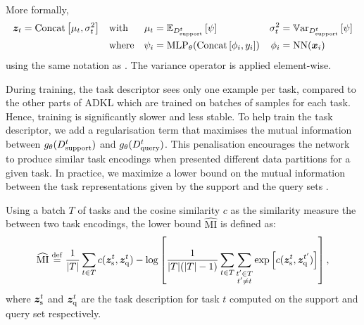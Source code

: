 \documentclass[11pt]{article}
\numberwithin{equation}{subsection}
\begin{document}
More formally,
\begin{align}
  {\bm{z}}_t &= \mathrm{Concat} \left[ \mu_t, \sigma_t^2 \right] & &\text{with} & \mu_t &= \mathbb{E}_{D_{\mathrm{support}}^t} \left[ \psi \right] & \sigma_t^2 &= \mathbb{V}\textrm{ar}_{D_{\mathrm{support}}^t} \left[ \psi \right] \\
  & & & \text{where} & \psi_i &= \mathrm{MLP}_\theta(\mathrm{Concat}\left[ \phi_i, y_i \right]) & \phi_i &= \mathrm{NN}({\bm{x}}_i)
\end{align}
using the same notation as . The variance operator is applied element-wise.

During training, the task descriptor sees only one example per task, compared to the other parts of ADKL which are trained on batches of samples for each task. Hence, training is significantly slower and less stable.
To help train the task descriptor, we add a regularisation term that maximises the mutual information between $g_\theta({D_{\mathrm{support}}^t})$ and $g_\theta({D_{\mathrm{query}}^t})$.
This penalisation encourages the network to produce similar task encodings when presented different data partitions for a given task.
In practice, we maximize a lower bound on the mutual information between the task representations given by the support and the query sets \citep{belghazi2018mine}.

Using a batch $T$ of tasks and the cosine similarity $c$ as the similarity measure the between two task encodings, the lower bound $\widehat{\mathrm{MI}}$ is defined as:
\begin{equation}
  \widehat{\mathrm{MI}} \stackrel{\mathrm{def}}{=} \frac{1}{|T|} \sum_{t \in T} c({\bm{z}}_\mathrm{s}^t, {\bm{z}}_\mathrm{q}^t)
  - \log \left[ \frac{1}{|T|(|T| - 1)} \sum_{t \in T} \sum_{\substack{t' \in T\\t' \neq t}} \exp \left[ c({\bm{z}}_\mathrm{s}^t, {\bm{z}}_\mathrm{q}^{t'}) \right] \right],
\end{equation}
where ${\bm{z}}_\mathrm{s}^t$ and ${\bm{z}}_\mathrm{q}^t$ are the task description for task $t$ computed on the support and query set respectively.
\end{document}
